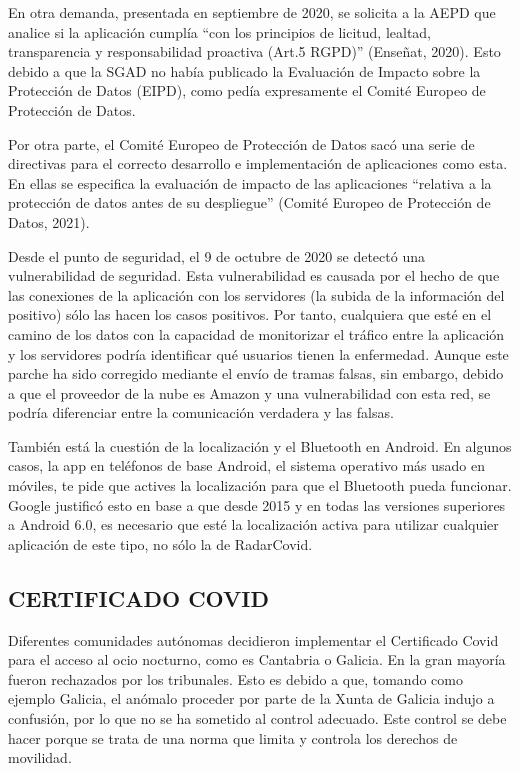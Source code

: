 \documentclass[11pt,a4paper,spanish]{article}
\begin{document}
En otra demanda, presentada en septiembre de 2020, se solicita a la AEPD que analice si la aplicación cumplía “con los principios de licitud, lealtad, transparencia y responsabilidad proactiva (Art.5 RGPD)” (Enseñat, 2020). Esto debido a que la SGAD no había publicado la Evaluación de Impacto sobre la Protección de Datos (EIPD), como pedía expresamente el Comité Europeo de Protección de Datos.
  
Por otra parte, el Comité Europeo de Protección de Datos sacó una serie de directivas para el correcto desarrollo e implementación de aplicaciones como esta. En ellas se especifica la evaluación de impacto de las aplicaciones “relativa a la protección de datos antes de su despliegue” (Comité Europeo de Protección de Datos, 2021).

Desde el punto de seguridad, el 9 de octubre de 2020 se detectó una vulnerabilidad de seguridad. Esta vulnerabilidad es causada por el hecho de que las conexiones de la aplicación con los servidores (la subida de la información del positivo) sólo las hacen los casos positivos. Por tanto, cualquiera que esté en el camino de los datos con la capacidad de monitorizar el tráfico entre la aplicación y los servidores podría identificar qué usuarios tienen la enfermedad. Aunque este parche ha sido corregido mediante el envío de tramas falsas, sin embargo, debido a que el proveedor de la nube es Amazon y una vulnerabilidad con esta red, se podría diferenciar entre la comunicación verdadera y las falsas.

También está la cuestión de la localización y el Bluetooth en Android. En algunos casos, la app en teléfonos de base Android, el sistema operativo más usado en móviles, te pide que actives la localización para que el Bluetooth pueda funcionar. Google justificó esto en base a que desde 2015 y en todas las versiones superiores a Android 6.0, es necesario que esté la localización activa para utilizar cualquier aplicación de este tipo, no sólo la de RadarCovid.

\subsection{CERTIFICADO COVID}

Diferentes comunidades autónomas decidieron implementar el Certificado Covid para el acceso al ocio nocturno, como es Cantabria o Galicia. En la gran mayoría fueron rechazados por los tribunales. 
Esto es debido a que, tomando como ejemplo Galicia, el anómalo proceder por parte de la Xunta de Galicia indujo a confusión, por lo que no se ha sometido al control adecuado. Este control se debe hacer porque se trata de una norma que limita y controla los derechos de movilidad.
\end{document}
